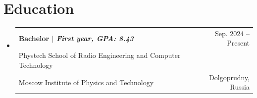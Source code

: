 \documentclass[A4,11pt]{article}
\makeatletter
\newcommand{\CVSubheading}[4]{
  \vspace{-2pt}\item
    \begin{tabular*}{0.97\textwidth}[t]{l@{\extracolsep{\fill}}r}
      \textbf{#1} & #2 \\
      \small#3 & \small #4 \\
    \end{tabular*}\vspace{-7pt}
}
\newcommand{\CVSubHeadingListStart}{\begin{itemize}[leftmargin=0.5cm, label={}]}
\newcommand{\CVSubHeadingListEnd}{\end{itemize}}
\makeatother
\begin{document}

\section{Education}
  \CVSubHeadingListStart
    \CVSubheading
      {{Bachelor $|$ \emph{\small{First year, GPA: 8.43}}}}{Sep. 2024 -- Present}
      {Phystech School of Radio Engineering and Computer Technology \\ Moscow Institute of Physics and Technology}{Dolgoprudny, Russia}
  \CVSubHeadingListEnd
\end{document}
